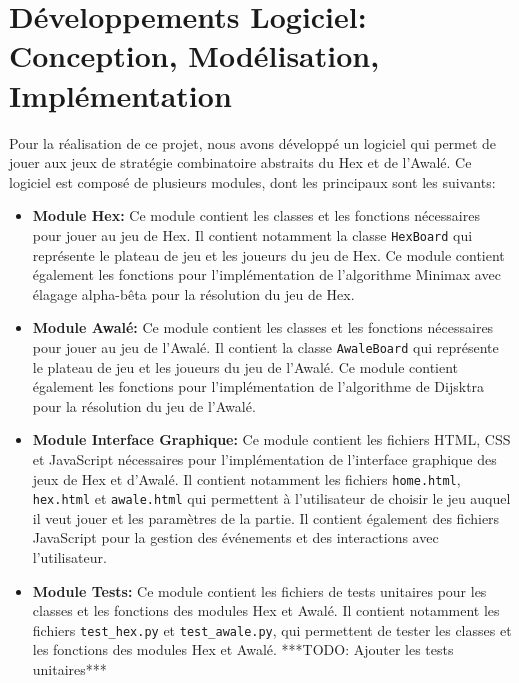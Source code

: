 \section{Développements Logiciel: Conception, Modélisation, Implémentation} 

Pour la réalisation de ce projet, nous avons développé un logiciel qui permet de jouer
aux jeux de stratégie combinatoire abstraits du Hex et de l'Awalé. Ce logiciel est
composé de plusieurs modules, dont les principaux sont les suivants:

\begin{itemize}
    \item \textbf{Module Hex:} Ce module contient les classes et les fonctions nécessaires
    pour jouer au jeu de Hex. Il contient notamment la classe \texttt{HexBoard} qui 
    représente le plateau de jeu et les joueurs du jeu de Hex. Ce module contient également 
    les fonctions pour l'implémentation de l'algorithme Minimax avec élagage alpha-bêta pour 
    la résolution du jeu de Hex.
    
    \item \textbf{Module Awalé:} Ce module contient les classes et les fonctions nécessaires
    pour jouer au jeu de l'Awalé. Il contient la classe \texttt{AwaleBoard} qui représente le
    plateau de jeu et les joueurs du jeu de l'Awalé. Ce module contient également les fonctions
    pour l'implémentation de l'algorithme de Dijsktra pour la résolution du jeu de l'Awalé.
    
    \item \textbf{Module Interface Graphique:} Ce module contient les fichiers HTML, CSS et
    JavaScript nécessaires pour l'implémentation de l'interface graphique des jeux de Hex et
    d'Awalé. Il contient notamment les fichiers \texttt{home.html}, \texttt{hex.html} et
    \texttt{awale.html} qui permettent à l'utilisateur de choisir le jeu auquel il veut jouer
    et les paramètres de la partie. Il contient également des fichiers JavaScript pour la
    gestion des événements et des interactions avec l'utilisateur.
    
    \item \textbf{Module Tests:} Ce module contient les fichiers de tests unitaires pour les
    classes et les fonctions des modules Hex et Awalé. Il contient notamment les fichiers
    \texttt{test\_hex.py} et \texttt{test\_awale.py}, qui permettent de tester les classes
    et les fonctions des modules Hex et Awalé. ***TODO: Ajouter les tests unitaires***
\end{itemize}


